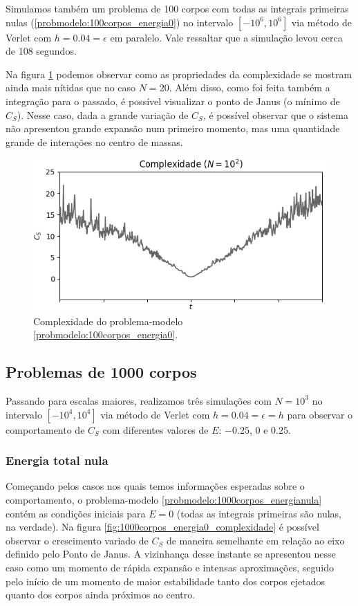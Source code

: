 Simulamos também um problema de 100 corpos com todas as integrais primeiras nulas (\ref{probmodelo:100corpos_energia0}) no intervalo $[-10^6,10^6]$ via método de Verlet com $h=0.04=\epsilon$ em paralelo. Vale ressaltar que a simulação levou cerca de 108 segundos.

Na figura \ref{fig:100corpos_complexidade} podemos observar como as propriedades da complexidade se mostram ainda mais nítidas que no caso $N=20$. Além disso, como foi feita também a integração para o passado, é possível visualizar o ponto de Janus (o mínimo de $C_S$). Nesse caso, dada a grande variação de $C_S$, é possível observar que o sistema não apresentou grande expansão num primeiro momento, mas uma quantidade grande de interações no centro de massas.

\begin{figure}
    \centering
    \includegraphics[width=0.6\linewidth]{tcc//img/complexidade100.png}
    \caption{Complexidade do problema-modelo \ref{probmodelo:100corpos_energia0}.}
    \label{fig:100corpos_complexidade}
\end{figure}


\subsection{Problemas de 1000 corpos}

Passando para escalas maiores, realizamos três simulações com $N=10^3$ no intervalo $[-10^4, 10^4]$ via método de Verlet com $h=0.04=\epsilon=h$ para observar o comportamento de $C_S$ com diferentes valores de $E$: $-0.25$, $0$ e $0.25$.


\subsubsection{Energia total nula}

Começando pelos casos nos quais temos informações esperadas sobre o comportamento, o problema-modelo \ref{probmodelo:1000corpos_energianula} contém as condições iniciais para $E=0$ (todas as integrais primeiras são nulas, na verdade). Na figura \ref{fig:1000corpos_energia0_complexidade} é possível observar o crescimento variado de $C_S$ de maneira semelhante em relação ao eixo definido pelo Ponto de Janus. A vizinhança desse instante se apresentou nesse caso como um momento de rápida expansão e intensas aproximações, seguido pelo início de um momento de maior estabilidade tanto dos corpos ejetados quanto dos corpos ainda próximos ao centro. 

